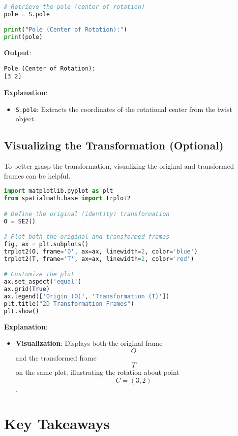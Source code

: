 \documentclass[12pt]{article}
\begin{document}
\begin{lstlisting}[language=Python]
# Retrieve the pole (center of rotation)
pole = S.pole

print("Pole (Center of Rotation):")
print(pole)
\end{lstlisting}

\textbf{Output}:
\begin{verbatim}
Pole (Center of Rotation):
[3 2]
\end{verbatim}

\textbf{Explanation}:
\begin{itemize}
    \item \texttt{S.pole}: Extracts the coordinates of the rotational center from the twist object.
\end{itemize}

\subsection{Visualizing the Transformation (Optional)}

To better grasp the transformation, visualizing the original and transformed frames can be helpful.

\begin{lstlisting}[language=Python]
import matplotlib.pyplot as plt
from spatialmath.base import trplot2

# Define the original (identity) transformation
O = SE2()

# Plot both the original and transformed frames
fig, ax = plt.subplots()
trplot2(O, frame='O', ax=ax, linewidth=2, color='blue')
trplot2(T, frame='T', ax=ax, linewidth=2, color='red')

# Customize the plot
ax.set_aspect('equal')
ax.grid(True)
ax.legend(['Origin (O)', 'Transformation (T)'])
plt.title("2D Transformation Frames")
plt.show()
\end{lstlisting}

\textbf{Explanation}:
\begin{itemize}
    \item \textbf{Visualization}: Displays both the original frame $$ O $$ and the transformed frame $$ T $$ on the same plot, illustrating the rotation about point $$ C = (3, 2) $$.
\end{itemize}

\section{Key Takeaways}
\end{document}

